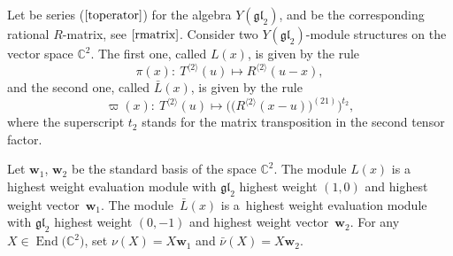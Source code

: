 \documentclass[pdftex]{sigma}
\numberwithin{equation}{section}
\newcommand\ltwo{\langle 2\rangle}
\begin{document}
Let \smash{$T_{a b}^{\ltwo}(u)$} be series ($\ref{toperator}$) for the algebra $Y(\mathfrak{g l}_{2})$, and \smash{$R^{\ltwo}(u)$} be the corresponding rational $R$-matrix, see $\eqref{rmatrix}$. Consider two $Y(\mathfrak{g l}_{2})$-module structures on the vector space $\mathbb{C}^2$. The first one, called $L(x)$, is given by the rule
\begin{equation*}
\pi(x)\colon \ T^{\ltwo}(u) \mapsto R^{\ltwo}(u-x),
\end{equation*}
and the second one, called $\bar{L}(x)$, is given by the rule
\begin{equation*}
\varpi(x)\colon \ T^{\ltwo}(u) \mapsto\bigl( \bigl(R^{\ltwo}(x-u)\bigr)^{(21)}\bigr)^{t_{2}},
\end{equation*}
where the superscript $t_{2}$ stands for the matrix transposition in the second tensor factor.

Let $\mathbf{w}_{1}$, $\mathbf{w}_{2}$ be the standard basis of the space $\mathbb{C}^{2}$. The module $L(x)$ is a highest weight evaluation module with $\mathfrak{g l}_{2} $ highest weight $(1, 0)$ and highest weight vector~$\mathbf{w}_{1}$. The module~$\bar{L}(x)$ is a~highest weight evaluation module with $\mathfrak{g l}_{2}$ highest weight $(0,-1)$ and highest weight vector~$\mathbf{w}_{2}$.
For any $X\in \operatorname{End}\bigl(\mathbb{C}^{2}\bigr)$, set $\nu(X)=X \mathbf{w}_{1}$ and $\bar{\nu}(X)=X \mathbf{w}_{2}$.
\end{document}
